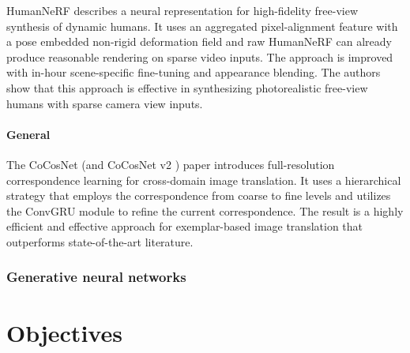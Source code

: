 HumanNeRF \cite{humannerf} describes a neural representation for high-fidelity
free-view synthesis of dynamic humans. It uses an aggregated pixel-alignment
feature with a pose embedded non-rigid deformation field and raw HumanNeRF can
already produce reasonable rendering on sparse video inputs. The approach is
improved with in-hour scene-specific fine-tuning and appearance blending. The
authors show that this approach is effective in synthesizing photorealistic
free-view humans with sparse camera view inputs.

\paragraph{General}

The CoCosNet \cite{CoCosNet} (and CoCosNet v2 \cite{CoCosNet2}) paper
introduces full-resolution correspondence learning for cross-domain image
translation. It uses a hierarchical strategy that employs the correspondence
from coarse to fine levels and utilizes the ConvGRU module to refine the
current correspondence. The result is a highly efficient and effective approach
for exemplar-based image translation that outperforms state-of-the-art
literature.

\subsubsection{Generative neural networks}

\section{Objectives}\label{objectives}

